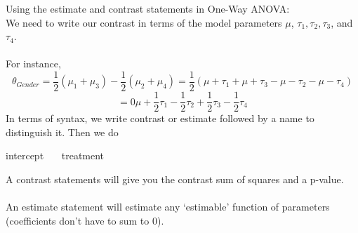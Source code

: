 \newpage

Using the estimate and contrast statements in One-Way ANOVA:\\
We need to write our contrast in terms of the model parameters $\mu$, $\tau_1, \tau_2,\tau_3$, and $\tau_4$. \\~\\
For instance, 
$$\theta_{Gender}=\frac{1}{2}(\mu_1+\mu_3)-\frac{1}{2}(\mu_2+\mu_4)=\frac{1}{2}(\mu+\tau_1+\mu+\tau_3-\mu-\tau_2-\mu-\tau_4)$$
$$=0\mu+\frac{1}{2}\tau_1-\frac{1}{2}\tau_2+\frac{1}{2}\tau_3-\frac{1}{2}\tau_4$$
In terms of syntax, we write contrast or estimate followed by a name to distinguish it.  Then we do
\begin{center}
intercept ~~~treatment ~~~~~~
\end{center}
A contrast statements will give you the contrast sum of squares and a p-value.\\~\\
An estimate statement will estimate any `estimable' function of parameters (coefficients don't have to sum to 0). 

